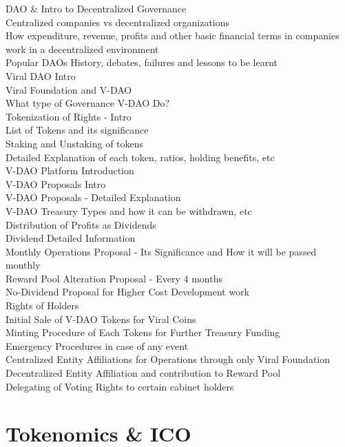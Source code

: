 \documentclass[conference]{IEEEtran}
\begin{document}
DAO \& Intro to Decentralized Governance\\
Centralized companies vs decentralized organizations\\
How expenditure, revenue, profits and other basic financial terms in companies work in a decentralized environment\\
Popular DAOs History, debates, failures and lessons to be learnt\\
Viral DAO Intro\\
Viral Foundation and V-DAO\\
What type of Governance V-DAO Do?\\
Tokenization of Rights - Intro\\
List of Tokens and its significance\\
Staking and Unstaking of tokens\\
Detailed Explanation of each token, ratios, holding benefits, etc\\
V-DAO Platform Introduction\\
V-DAO Proposals Intro\\
V-DAO Proposals - Detailed Explanation\\
V-DAO Treasury Types and how it can be withdrawn, etc\\
Distribution of Profits as Dividends\\
Dividend Detailed Information\\
Monthly Operations Proposal - Its Significance and How it will be passed monthly\\
Reward Pool Alteration Proposal - Every 4 months\\
No-Dividend Proposal for Higher Cost Development work\\
Rights of Holders\\
Initial Sale of V-DAO Tokens for Viral Coins\\
Minting Procedure of Each Tokens for Further Treasury Funding\\
Emergency Procedures in case of any event\\
Centralized Entity Affiliations for Operations through only Viral Foundation\\
Decentralized Entity Affiliation  and contribution to Reward Pool\\
Delegating of Voting Rights to certain cabinet holders\\


\section{\textbf{Tokenomics \& ICO}}
\end{document}
